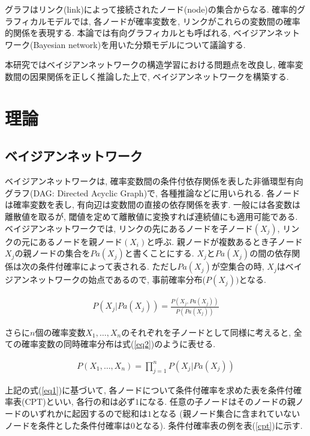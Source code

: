 \documentclass[a4paper]{jarticle}
\begin{document}
グラフはリンク(link)によって接続されたノード(node)の集合からなる. 確率的グラフィカルモデルでは, 各ノードが確率変数を, リンクがこれらの変数間の確率的関係を表現する. 本論では有向グラフィカルとも呼ばれる, ベイジアンネットワーク(Bayesian network)を用いた分類モデルについて議論する.

本研究ではベイジアンネットワークの構造学習における問題点を改良し, 確率変数間の因果関係を正しく推論した上で, ベイジアンネットワークを構築する.

\section{理論}

\subsection{ベイジアンネットワーク}

ベイジアンネットワークは, 確率変数間の条件付依存関係を表した非循環型有向グラフ(DAG: Directed Acyclic Graph)で, 各種推論などに用いられる. 各ノードは確率変数を表し, 有向辺は変数間の直接の依存関係を表す. 一般には各変数は離散値を取るが, 閾値を定めて離散値に変換すれば連続値にも適用可能である. ベイジアンネットワークでは, リンクの先にあるノードを子ノード$(X_j)$, リンクの元にあるノードを親ノード$(X_i)$と呼ぶ. 親ノードが複数あるとき子ノード$X_j$の親ノードの集合を$Pa(X_j)$と書くことにする. $X_j$と$Pa(X_j)$の間の依存関係は次の条件付確率によって表される. ただし$Pa(X_j)$が空集合の時, $X_j$はベイジアンネットワークの始点であるので, 事前確率分布($P(X_j))$となる.

\begin{eqnarray}
\label{eq1}
P(X_j | Pa(X_j)) = \frac{P(X_j, Pa(X_j))}{P(Pa(X_j))} 
\end{eqnarray}

さらに$n$個の確率変数$X_1, \dots, X_n$のそれぞれを子ノードとして同様に考えると, 全ての確率変数の同時確率分布は式(\ref{eq2})のように表せる.

\begin{eqnarray}
\label{eq2}
P(X_1, \dots, X_n) = \prod_{j=1}^n P(X_j | Pa(X_j))
\end{eqnarray}

上記の式(\ref{eq1})に基づいて, 各ノードについて条件付確率を求めた表を条件付確率表(CPT)といい, 各行の和は必ず$1$になる. 任意の子ノードはそのノードの親ノードのいずれかに起因するので総和は$1$となる (親ノード集合に含まれていないノードを条件とした条件付確率は$0$となる). 条件付確率表の例を表(\ref{cpt})に示す. 
\end{document}
